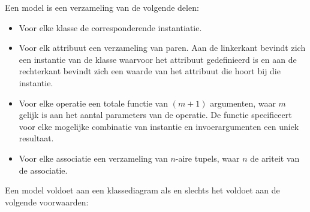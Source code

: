 Een model is een verzameling van de volgende delen:

\begin{itemize}
	\item Voor elke klasse de corresponderende instantiatie.
	\item Voor elk attribuut een verzameling van paren. Aan de linkerkant bevindt zich een instantie van de klasse waarvoor het attribuut gedefinieerd is en aan de rechterkant bevindt zich een waarde van het attribuut die hoort bij die instantie.
	\item Voor elke operatie een totale functie van $(m+1)$ argumenten, waar $m$ gelijk is aan het aantal parameters van de operatie. De functie specificeert voor elke mogelijke combinatie van instantie en invoerargumenten een uniek resultaat.
	\item Voor elke associatie een verzameling van $n$-aire tupels, waar $n$ de ariteit van de associatie.
\end{itemize}

Een model voldoet aan een klassediagram als en slechts het voldoet aan de volgende voorwaarden:

